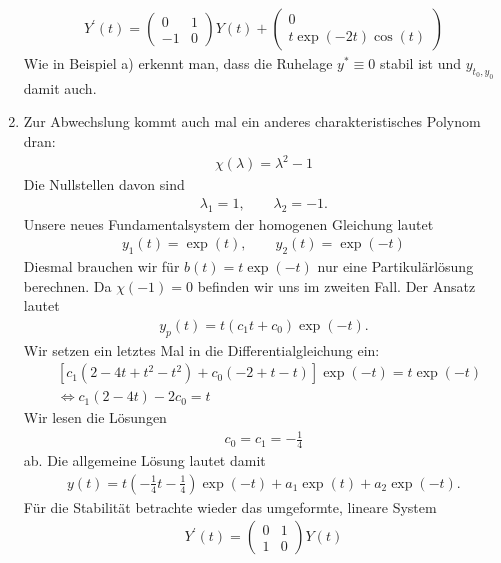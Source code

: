 \begin{solution}
\begin{enumerate}[label = \textbf{\alph*)}]
  \begin{align*}
    Y^{\prime}(t) = \begin{pmatrix}
      0 & 1 \\
      -1 & 0
    \end{pmatrix}Y(t)
    + \begin{pmatrix}
      0 \\ t\exp(-2t)\cos(t)
    \end{pmatrix}
  \end{align*}
  Wie in Beispiel a) erkennt man, dass die Ruhelage $y^* \equiv 0$ stabil ist und $y_{t_0,y_0}$ damit auch.
  \item Zur Abwechslung kommt auch mal ein anderes charakteristisches Polynom dran:
  \begin{align*}
    \chi(\lambda) = \lambda^2 - 1
  \end{align*}
  Die Nullstellen davon sind
  \begin{align*}
    \lambda_1 = 1, \qquad \lambda_2 = -1.
  \end{align*}
  Unsere neues Fundamentalsystem der homogenen Gleichung lautet
  \begin{align*}
    y_1(t) = \exp(t), \qquad y_2(t) = \exp(-t)
  \end{align*}
  Diesmal brauchen wir für $b(t) = t\exp(-t)$ nur eine Partikulärlösung berechnen.
  Da $\chi(-1) = 0$ befinden wir uns im zweiten Fall. Der Ansatz lautet
  \begin{align*}
    y_p(t) = t(c_1t + c_0)\exp(-t).
  \end{align*}
  Wir setzen ein letztes Mal in die Differentialgleichung ein:
  \begin{align*}
    &[c_1(2 - 4t + t^2 - t^2)+ c_0(-2 + t - t)]\exp(-t) = t\exp(-t) \\
    &\iff c_1(2 - 4t) - 2c_0 = t
  \end{align*}
  Wir lesen die Lösungen
  \begin{align*}
    c_0 = c_1 = -\frac{1}{4}
  \end{align*}
  ab. Die allgemeine Lösung lautet damit
  \begin{align*}
    y(t) = t(-\frac{1}{4}t - \frac{1}{4})\exp(-t) + a_1\exp(t) + a_2\exp(-t).
  \end{align*}
  Für die Stabilität betrachte wieder das umgeformte, lineare System
  \begin{align*}
    Y^{\prime}(t) = \begin{pmatrix}
      0 & 1 \\
      1 & 0
    \end{pmatrix}Y(t)

\end{align*}
\end{enumerate}
\end{solution}
